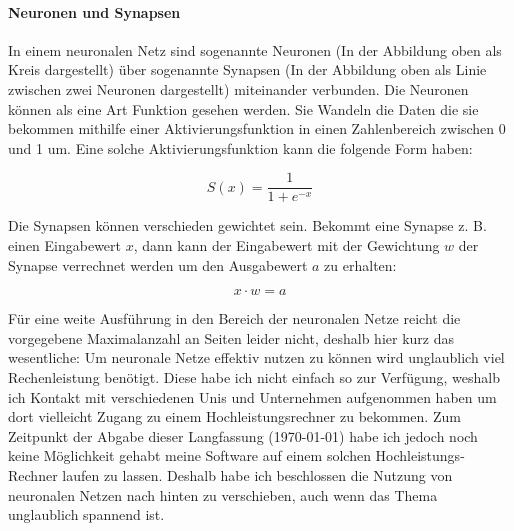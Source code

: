 \paragraph{Neuronen und Synapsen}

In einem neuronalen Netz sind sogenannte Neuronen (In der Abbildung oben als
Kreis dargestellt) über sogenannte Synapsen (In der Abbildung oben als Linie
zwischen zwei Neuronen dargestellt) miteinander verbunden.
Die Neuronen können als eine Art Funktion gesehen werden. Sie Wandeln die Daten
die sie bekommen mithilfe einer Aktivierungsfunktion in einen Zahlenbereich
zwischen 0 und 1 um. Eine solche Aktivierungsfunktion kann die folgende Form
haben:

\begin{equation}
  S(x) = \frac{1}{1 + e^{-x}}
\end{equation}

Die Synapsen können verschieden gewichtet sein. Bekommt eine Synapse z. B.
einen Eingabewert \( x \), dann kann der Eingabewert mit der Gewichtung \( w \)
der Synapse verrechnet werden um den Ausgabewert \( a \) zu erhalten:

\begin{equation}
  x \cdot w = a
\end{equation}

Für eine weite Ausführung in den Bereich der neuronalen Netze reicht die vorgegebene
Maximalanzahl an Seiten leider nicht, deshalb hier kurz das wesentliche:
Um neuronale Netze effektiv nutzen zu können wird unglaublich viel
Rechenleistung benötigt. Diese habe ich nicht einfach so zur Verfügung, weshalb
ich Kontakt mit verschiedenen Unis und Unternehmen aufgenommen haben um dort
vielleicht Zugang zu einem Hochleistungsrechner zu bekommen. Zum Zeitpunkt der
Abgabe dieser Langfassung (\today) habe ich jedoch noch keine Möglichkeit gehabt
meine Software auf einem solchen Hochleistungs-Rechner laufen zu lassen. Deshalb
habe ich beschlossen die Nutzung von neuronalen Netzen nach hinten zu verschieben,
auch wenn das Thema unglaublich spannend ist.

